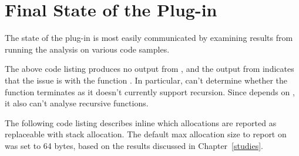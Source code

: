 \section{Final State of the Plug-in}\label{pluginstate}

The state of the  plug-in is most easily communicated by examining results from running the analysis on various code samples.



The above code listing produces no output from , and the output from  indicates that the issue is with the function . In particular,  can't determine whether the function terminates as it doesn't currently support recursion. Since  depends on , it also can't analyse recursive functions.

The following code listing describes inline which allocations are reported as replaceable with stack allocation. The default max allocation size to report on was set to 64 bytes, based on the results discussed in Chapter~\ref{studies}.



